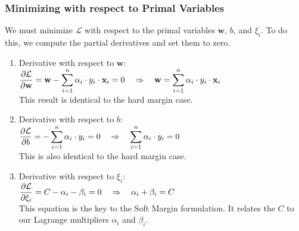\subsubsection{Minimizing with respect to Primal Variables}
We must minimize $\mathcal{L}$ with respect to the primal variables $\mathbf{w}$, $b$, and $\xi_i$. To do this, we compute the partial derivatives and set them to zero.
\begin{enumerate}
\item Derivative with respect to $\mathbf{w}$:
      \\[0.2cm]
      \hspace*{1.3cm}
      $\displaystyle \frac{\partial \mathcal{L}}{\partial \mathbf{w}} = \mathbf{w} - \sum_{i=1}^n \alpha_i \cdot y_i\cdot
      \mathbf{x}_i = 0 \quad \Rightarrow \quad \mathbf{w} = \sum_{i=1}^n \alpha_i \cdot y_i \cdot\mathbf{x}_i$
      \\[0.2cm]
      This result is identical to the hard margin case.
\item Derivative with respect to $b$:
      \\[0.2cm]
      \hspace*{1.3cm}
      $\displaystyle \frac{\partial \mathcal{L}}{\partial b} = - \sum_{i=1}^n \alpha_i \cdot y_i = 0 \quad
         \Rightarrow \quad \sum_{i=1}^n \alpha_i \cdot y_i = 0$
      \\[0.2cm]
      This is also identical to the hard margin case.
\item Derivative with respect to $\xi_i$:
      \\[0.2cm]
      \hspace*{1.3cm}
      $\displaystyle \frac{\partial \mathcal{L}}{\partial \xi_i} = C - \alpha_i - \beta_i = 0 \quad
         \Rightarrow \quad \alpha_i + \beta_i = C$
      \\[0.2cm]
      This equation is the key to the Soft Margin formulation. It relates the  $C$ to
      our Lagrange multipliers $\alpha_i$ and $\beta_i$. 
\end{enumerate}

